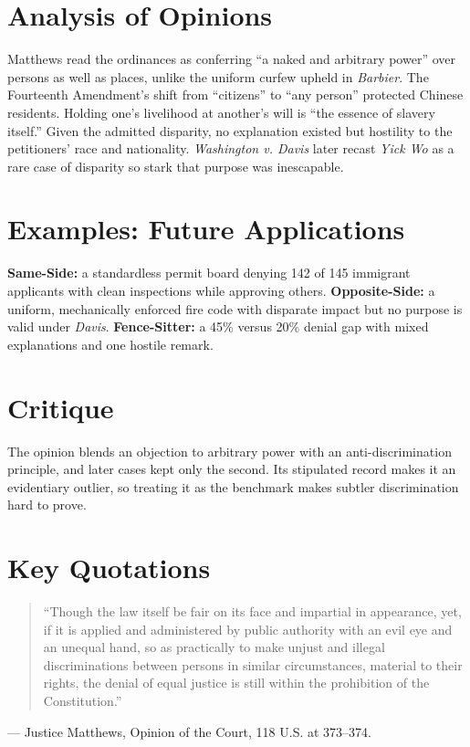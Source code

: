 \documentclass[12pt]{article}
\begin{document}
\section{Analysis of Opinions}
Matthews read the ordinances as conferring ``a naked and arbitrary power'' over persons as well as places, unlike the uniform curfew upheld in \textit{Barbier}. The Fourteenth Amendment's shift from ``citizens'' to ``any person'' protected Chinese residents. Holding one's livelihood at another's will is ``the essence of slavery itself.'' Given the admitted disparity, no explanation existed but hostility to the petitioners' race and nationality. \textit{Washington v. Davis} later recast \textit{Yick Wo} as a rare case of disparity so stark that purpose was inescapable.

\section{Examples: Future Applications}
\textbf{Same-Side:} a standardless permit board denying 142 of 145 immigrant applicants with clean inspections while approving others. \textbf{Opposite-Side:} a uniform, mechanically enforced fire code with disparate impact but no purpose is valid under \textit{Davis}. \textbf{Fence-Sitter:} a 45\% versus 20\% denial gap with mixed explanations and one hostile remark.

\section{Critique}
The opinion blends an objection to arbitrary power with an anti-discrimination principle, and later cases kept only the second. Its stipulated record makes it an evidentiary outlier, so treating it as the benchmark makes subtler discrimination hard to prove.

\section{Key Quotations}
\begin{quote}
``Though the law itself be fair on its face and impartial in appearance, yet, if it is applied and administered by public authority with an evil eye and an unequal hand, so as practically to make unjust and illegal discriminations between persons in similar circumstances, material to their rights, the denial of equal justice is still within the prohibition of the Constitution.''
\end{quote}
\noindent --- Justice Matthews, Opinion of the Court, 118 U.S. at 373--374.
\end{document}
